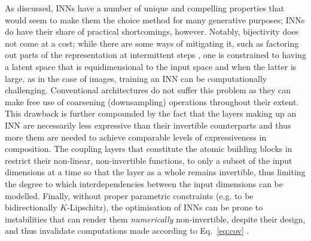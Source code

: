 %
As discussed, INNs have a number of unique and compelling properties that would seem to make them
the choice method for many generative purposes; INNs do have their share of practical
shortcomings, however. 
%
Notably, bijectivity does not come at a cost; while there are some ways of mitigating it, such as
factoring out parts of the representation at intermittent steps \citep{hoogeboom2019integer}, one
is constrained to having a latent space that is equidimensional to the input space and when the
latter is large, as in the case of images, training an INN can be computationally challenging.
%
Conventional architectures do not suffer this problem as they can make free use of coarsening
(downsampling) operations throughout their extent.
%
This drawback is further compounded by the fact that the layers making up an INN are necessarily
less expressive than their invertible counterparts and thus more them are needed to achieve
comparable levels of expressiveness in composition. 
%
The coupling layers that constitute the atomic building blocks in \cite{dinh2014nice} restrict
their non-linear, non-invertible functions, to only a subset of the input dimensions at a time so
that the layer as a whole remains invertible, thus limiting the degree to which interdependencies
between the input dimensions can be modelled.
%
Finally, without proper parametric constraints (e.g. to be bidirectionally \(K\)-Lipschitz), the
optimisation of INNs can be prone to instabilities that can render them \emph{numerically}
non-invertible, despite their design, and thus invalidate computations made according to
Eq.~\ref{eq:cov} \citep{behrmann2021understanding}.
